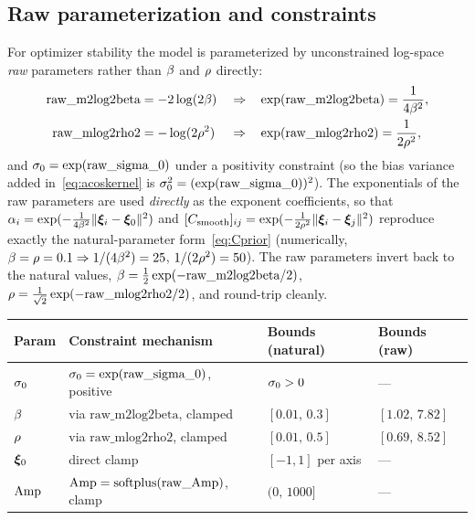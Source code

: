 \subsection{Raw parameterization and constraints}
\label{subsec:rawparam}

For optimizer stability the model is parameterized by unconstrained log-space
\emph{raw} parameters rather than $\beta$ and $\rho$ directly:
\begin{equation}
\begin{aligned}
\text{raw\_m2log2beta}&=-2\log(2\beta)&&\Rightarrow&&\exp(\text{raw\_m2log2beta})=\frac{1}{4\beta^2},\\
\text{raw\_mlog2rho2}&=-\log(2\rho^2)&&\Rightarrow&&\exp(\text{raw\_mlog2rho2})=\frac{1}{2\rho^2},
\end{aligned}
\end{equation}
and $\sigma_{0}=\exp(\text{raw\_sigma\_0})$ under a positivity constraint (so the bias
variance added in~\eqref{eq:acoskernel} is $\sigma_{0}^2=(\exp(\text{raw\_sigma\_0}))^2$).
The exponentials of the raw parameters are used \emph{directly} as the exponent
coefficients, so that
$\alpha_i=\exp(-\tfrac{1}{4\beta^2}\lVert\bm{\xi}_i-\bm{\xi}_{0}\rVert^2)$ and
$[C_{\mathrm{smooth}}]_{ij}=\exp(-\tfrac{1}{2\rho^2}\lVert\bm{\xi}_i-\bm{\xi}_j\rVert^2)$ reproduce
exactly the natural-parameter form~\eqref{eq:Cprior} (numerically,
$\beta=\rho=0.1\Rightarrow 1/(4\beta^2)=25$, $1/(2\rho^2)=50$). The raw
parameters invert back to the natural values,
$\beta=\tfrac12\exp(-\text{raw\_m2log2beta}/2)$,
$\rho=\tfrac{1}{\sqrt2}\exp(-\text{raw\_mlog2rho2}/2)$, and round-trip cleanly.

\begin{table}[h]
\centering
\begin{tabular}{@{}llll@{}}
\toprule
Param & Constraint mechanism & Bounds (natural) & Bounds (raw) \\
\midrule
$\sigma_{0}$ & $\sigma_{0}=\exp(\text{raw\_sigma\_0})$, positive & $\sigma_{0}>0$ & --- \\
$\beta$ & via $\text{raw\_m2log2beta}$, clamped & $[0.01,\,0.3]$ & $[1.02,\,7.82]$ \\
$\rho$ & via $\text{raw\_mlog2rho2}$, clamped & $[0.01,\,0.5]$ & $[0.69,\,8.52]$ \\
$\bm{\xi}_{0}$ & direct clamp & $[-1,1]$ per axis & --- \\
$\mathrm{Amp}$ & $\mathrm{Amp}=\mathrm{softplus}(\text{raw\_Amp})$, clamp & $(0,\,1000]$ & --- \\
\bottomrule
\end{tabular}
\end{table}

